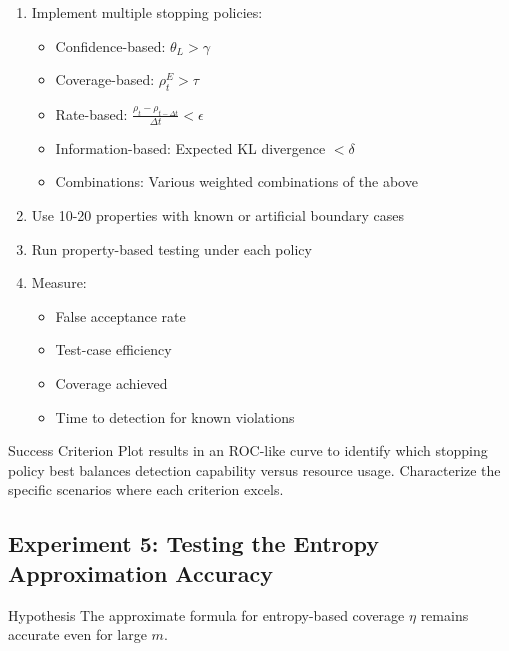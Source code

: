\documentclass[conference]{IEEEtran}
\begin{document}
\begin{tcolorbox}[
  colback=blue!5!white,
  colframe=blue!75!black,
  title=Experimental Design,
  fonttitle=\bfseries
]
\begin{enumerate}
\item Implement multiple stopping policies:
   \begin{itemize}
   \item Confidence-based: $\theta_L > \gamma$
   \item Coverage-based: $\rho_t^E > \tau$
   \item Rate-based: $\frac{\rho_t - \rho_{t-\Delta t}}{\Delta t} < \epsilon$
   \item Information-based: Expected KL divergence $< \delta$
   \item Combinations: Various weighted combinations of the above
   \end{itemize}
\item Use 10-20 properties with known or artificial boundary cases
\item Run property-based testing under each policy
\item Measure:
   \begin{itemize}
   \item False acceptance rate
   \item Test-case efficiency
   \item Coverage achieved
   \item Time to detection for known violations
   \end{itemize}
\end{enumerate}
\end{tcolorbox}

\begin{definitionbox}{Success Criterion}
Plot results in an ROC-like curve to identify which stopping policy best balances detection capability versus resource usage. Characterize the specific scenarios where each criterion excels.
\end{definitionbox}

\subsection{Experiment 5: Testing the Entropy Approximation Accuracy}

\begin{theorembox}{Hypothesis}
The approximate formula for entropy-based coverage $\eta$ remains accurate even for large $m$.
\end{theorembox}
\end{document}
